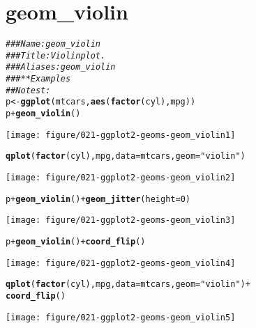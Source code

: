 \documentclass[a4paper,titlepage]{tufte-handout}\usepackage[]{graphicx}\usepackage[]{color}
\makeatletter
\def\maxwidth{ %
  \ifdim\Gin@nat@width>\linewidth
    \linewidth
  \else
    \Gin@nat@width
  \fi
}
\newcommand{\hlnum}[1]{\textcolor[rgb]{0.686,0.059,0.569}{#1}}%
\newcommand{\hlstr}[1]{\textcolor[rgb]{0.192,0.494,0.8}{#1}}%
\newcommand{\hlcom}[1]{\textcolor[rgb]{0.678,0.584,0.686}{\textit{#1}}}%
\newcommand{\hlopt}[1]{\textcolor[rgb]{0,0,0}{#1}}%
\newcommand{\hlstd}[1]{\textcolor[rgb]{0.345,0.345,0.345}{#1}}%
\newcommand{\hlkwb}[1]{\textcolor[rgb]{0.69,0.353,0.396}{#1}}%
\newcommand{\hlkwc}[1]{\textcolor[rgb]{0.333,0.667,0.333}{#1}}%
\newcommand{\hlkwd}[1]{\textcolor[rgb]{0.737,0.353,0.396}{\textbf{#1}}}%
\newenvironment{kframe}{%
 \def\at@end@of@kframe{}%
 \ifinner\ifhmode%
  \def\at@end@of@kframe{\end{minipage}}%
  \begin{minipage}{\columnwidth}%
 \fi\fi%
 \def\FrameCommand##1{\hskip\@totalleftmargin \hskip-\fboxsep
 \colorbox{shadecolor}{##1}\hskip-\fboxsep
     \hskip-\linewidth \hskip-\@totalleftmargin \hskip\columnwidth}%
 \MakeFramed {\advance\hsize-\width
   \@totalleftmargin\z@ \linewidth\hsize
   \@setminipage}}%
 {\par\unskip\endMakeFramed%
 \at@end@of@kframe}
\newenvironment{knitrout}{}{} %
\makeatother
\begin{document}
\section{geom\_violin}

\begin{knitrout}
\color{fgcolor}\begin{kframe}
\begin{alltt}
\hlcom{### Name: geom_violin}
\hlcom{### Title: Violin plot.}
\hlcom{### Aliases: geom_violin}
\hlcom{### ** Examples}
\hlcom{## No test: }
\hlstd{p} \hlkwb{<-} \hlkwd{ggplot}\hlstd{(mtcars,} \hlkwd{aes}\hlstd{(}\hlkwd{factor}\hlstd{(cyl), mpg))}
\hlstd{p} \hlopt{+} \hlkwd{geom_violin}\hlstd{()}
\end{alltt}
\end{kframe}
\texttt{[image: figure/021-ggplot2-geoms-geom\_violin1]} 
\begin{kframe}\begin{alltt}
\hlkwd{qplot}\hlstd{(}\hlkwd{factor}\hlstd{(cyl), mpg,} \hlkwc{data} \hlstd{= mtcars,} \hlkwc{geom} \hlstd{=} \hlstr{"violin"}\hlstd{)}
\end{alltt}
\end{kframe}
\texttt{[image: figure/021-ggplot2-geoms-geom\_violin2]} 
\begin{kframe}\begin{alltt}
\hlstd{p} \hlopt{+} \hlkwd{geom_violin}\hlstd{()} \hlopt{+} \hlkwd{geom_jitter}\hlstd{(}\hlkwc{height} \hlstd{=} \hlnum{0}\hlstd{)}
\end{alltt}
\end{kframe}
\texttt{[image: figure/021-ggplot2-geoms-geom\_violin3]} 
\begin{kframe}\begin{alltt}
\hlstd{p} \hlopt{+} \hlkwd{geom_violin}\hlstd{()} \hlopt{+} \hlkwd{coord_flip}\hlstd{()}
\end{alltt}
\end{kframe}
\texttt{[image: figure/021-ggplot2-geoms-geom\_violin4]} 
\begin{kframe}\begin{alltt}
\hlkwd{qplot}\hlstd{(}\hlkwd{factor}\hlstd{(cyl), mpg,} \hlkwc{data} \hlstd{= mtcars,} \hlkwc{geom} \hlstd{=} \hlstr{"violin"}\hlstd{)} \hlopt{+}
  \hlkwd{coord_flip}\hlstd{()}
\end{alltt}
\end{kframe}
\texttt{[image: figure/021-ggplot2-geoms-geom\_violin5]} 

\end{knitrout}
\end{document}
